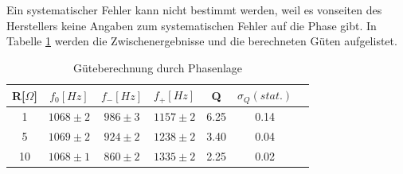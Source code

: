 \documentclass[12pt,a4paper]{article}
\begin{document}
Ein systematischer Fehler kann nicht bestimmt werden, weil es vonseiten des Herstellers keine Angaben zum systematischen Fehler auf die Phase gibt. In Tabelle \ref{table:S_phi} werden die Zwischenergebnisse und die berechneten Güten aufgelistet.
\begin{table}[H]
	\centering
	\begin{tabular}{|c|c|c|c|c|c|c|}
		\hline
		R[$\Omega$]&$f_0[Hz]$&$f_-[Hz]$&$f_+[Hz]$&Q&$\sigma_Q(stat.)$\\
		\hline
		1&$1068\pm2$&$986\pm3$&$1157\pm2$&6.25&0.14\\
		5&$1069\pm2$&$924\pm2$&$1238\pm2$&3.40&0.04\\
		10&$1068\pm1$&$860\pm2$&$1335\pm2$&2.25&0.02\\
		\hline		
	\end{tabular}
	\caption{Güteberechnung durch Phasenlage}
	\label{table:S_phi}
\end{table}
\end{document}
